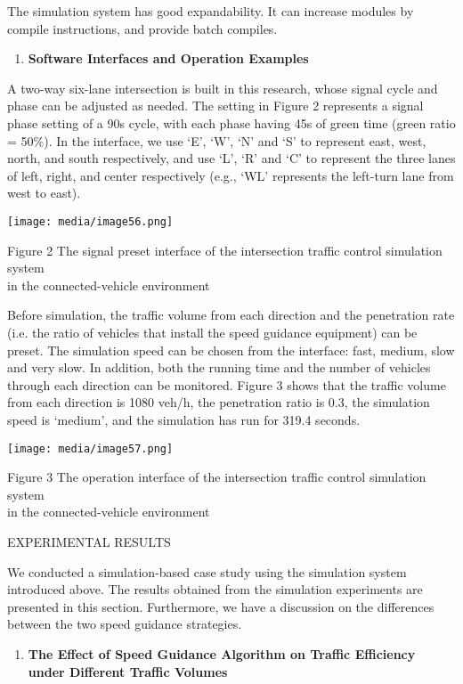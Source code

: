 The simulation system has good expandability. It can increase modules by
compile instructions, and provide batch compiles.

\begin{enumerate}
\def\labelenumi{\arabic{enumi}.}
\item
  \textbf{Software Interfaces and Operation Examples}
\end{enumerate}

A two-way six-lane intersection is built in this research, whose signal
cycle and phase can be adjusted as needed. The setting in Figure 2
represents a signal phase setting of a 90s cycle, with each phase having
45s of green time (green ratio = 50\%). In the interface, we use `E',
`W', `N' and `S' to represent east, west, north, and south respectively,
and use `L', `R' and `C' to represent the three lanes of left, right,
and center respectively (e.g., `WL' represents the left-turn lane from
west to east).

\texttt{[image: media/image56.png]}

Figure 2 The signal preset interface of the intersection traffic control
simulation system\\
in the connected-vehicle environment

Before simulation, the traffic volume from each direction and the
penetration rate (i.e. the ratio of vehicles that install the speed
guidance equipment) can be preset. The simulation speed can be chosen
from the interface: fast, medium, slow and very slow. In addition, both
the running time and the number of vehicles through each direction can
be monitored. Figure 3 shows that the traffic volume from each direction
is 1080 veh/h, the penetration ratio is 0.3, the simulation speed is
`medium', and the simulation has run for 319.4 seconds.

\texttt{[image: media/image57.png]}

Figure 3 The operation interface of the intersection traffic control
simulation system\\
in the connected-vehicle environment

EXPERIMENTAL RESULTS

We conducted a simulation-based case study using the simulation system
introduced above. The results obtained from the simulation experiments
are presented in this section. Furthermore, we have a discussion on the
differences between the two speed guidance strategies.

\begin{enumerate}
\def\labelenumi{\arabic{enumi}.}
\item
  \textbf{The Effect of Speed Guidance Algorithm on Traffic Efficiency
  under Different Traffic Volumes}
\end{enumerate}

